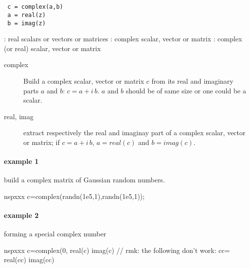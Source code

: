 
\begin{mandesc}
   \\
   \\
\end{mandesc}

\begin{calling_sequence}
\begin{verbatim}
 c = complex(a,b)
 a = real(z)
 b = imag(z)
\end{verbatim}
\end{calling_sequence}

\begin{parameters}
  \begin{varlist}
   : real scalars or vectors or matrices
   : complex scalar, vector or matrix
   : complex (or real) scalar, vector or matrix
  \end{varlist}
\end{parameters}

\begin{mandescription}
\begin{description}
\item[complex]  Build a complex scalar, vector or matrix $c$ from its real and imaginary parts
  $a$ and $b$: $c = a + i \, b$.
 $a$ and $b$ should be of same size or one could be a scalar.
\item[real, imag] extract respectively the real and imaginay part of a complex scalar, 
 vector or matrix; if $c = a + i \, b$, $ a = real(c)$ and $ b = imag(c)$. 
\end{description}
\end{mandescription}

\begin{examples}
\paragraph{example 1} build a complex matrix of Gaussian random numbers.
\begin{mintednsp}{nspxxx}
c=complex(randn(1e5,1),randn(1e5,1));
\end{mintednsp}

\paragraph{example 2} forming a special complex number
\begin{mintednsp}{nspxxx}
c=complex(0,%
real(c)
imag(c)
// rmk: the following don't work:
cc=%
real(cc)
imag(cc)
\end{mintednsp}


\end{examples}


\begin{manseealso}
\end{manseealso}
